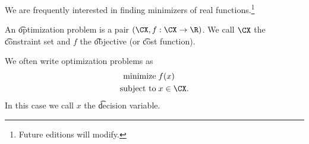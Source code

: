 

We are frequently interested in finding minimizers of real functions.\footnote{Future editions will modify.}


An \t{optimization problem} is a pair $(\CX, f: \CX \to \R)$.
We call $\CX$ the \t{constraint set} and $f$ the \t{objective} (or \t{cost function}).


We often write optimization problems as
\[
  \begin{aligned}
  \text{minimize}\; & f(x) \\
  \text{subject to}\; & x \in \CX.
  \end{aligned}
\]
In this case we call $x$ the \t{decision variable}.



\blankpage
